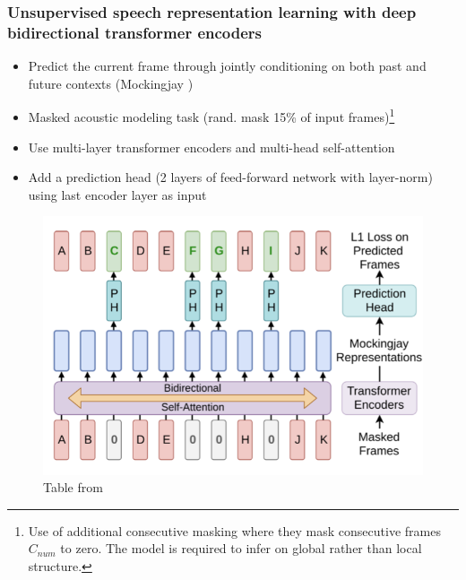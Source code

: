 \documentclass[table]{beamer}
\begin{document}
\begin{frame}
\frametitle{Unsupervised speech representation learning with deep bidirectional transformer encoders}

		\begin{itemize}
			\item Predict the current frame through jointly conditioning on both past and future contexts (Mockingjay \citep{Liu_2020})
			\item Masked acoustic modeling task (rand. mask 15\% of input frames)\footnote{Use of additional consecutive masking where they mask consecutive frames $C_{num}$ to zero. The model is required to infer on global rather than local structure.}
			\item Use multi-layer transformer encoders and multi-head self-attention
			\item Add a prediction head (2 layers of feed-forward network with layer-norm) using last encoder layer as input
		\end{itemize} 
		
				\begin{figure}
			\centering
			\includegraphics[scale=0.14]	{mockingjay} 
			\caption{Table from  \citep{Liu_2020}}
			\end{figure}


\end{frame}
\end{document}

